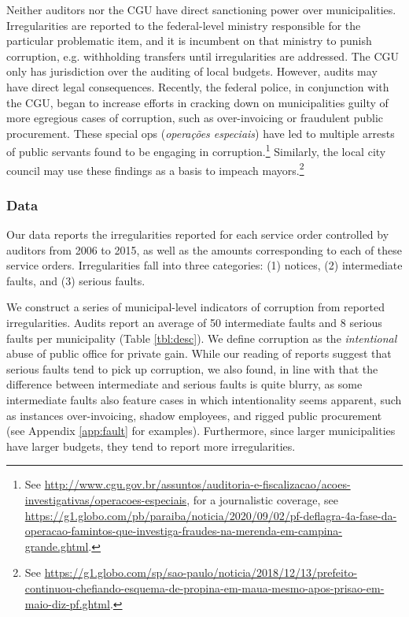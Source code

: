 \documentclass[12pt,a4paper]{article}
\theoremstyle{definition}
\begin{document}
Neither auditors nor the CGU have direct sanctioning power over municipalities. Irregularities are reported to the federal-level ministry responsible for the particular problematic item, and it is incumbent on that ministry to punish corruption, e.g. withholding transfers until irregularities are addressed. The CGU only has jurisdiction over the auditing of local budgets. However, audits may have direct legal consequences. Recently, the federal police, in conjunction with the CGU, began to increase efforts in cracking down on municipalities guilty of more egregious cases of corruption, such as over-invoicing or fraudulent public procurement. These special ops (\emph{operações especiais}) have led to multiple arrests of public servants found to be engaging in corruption.\footnote{See \url{http://www.cgu.gov.br/assuntos/auditoria-e-fiscalizacao/acoes-investigativas/operacoes-especiais}, for a journalistic coverage, see \url{https://g1.globo.com/pb/paraiba/noticia/2020/09/02/pf-deflagra-4a-fase-da-operacao-famintos-que-investiga-fraudes-na-merenda-em-campina-grande.ghtml}.} Similarly, the local city council may use these findings as a basis to impeach mayors.\footnote{See \url{https://g1.globo.com/sp/sao-paulo/noticia/2018/12/13/prefeito-continuou-chefiando-esquema-de-propina-em-maua-mesmo-apos-prisao-em-maio-diz-pf.ghtml}.}  %

\subsubsection*{Data}

Our data reports the irregularities reported for each service order controlled by auditors from 2006 to 2015, as well as the amounts corresponding to each of these service orders. Irregularities fall into three categories: (1) notices, (2) intermediate faults, and (3) serious faults. 

We construct a series of municipal-level indicators of corruption from reported irregularities. Audits report an average of 50 intermediate faults and 8 serious faults per municipality (Table \ref{tbl:desc}). We define corruption as the \emph{intentional} abuse of public office for private gain. While our reading of reports suggest that serious faults tend to pick up corruption, we also found, in line with \citet{avis_government_2018} that the difference between intermediate and serious faults is quite blurry, as some intermediate faults also feature cases in which intentionality seems apparent, such as instances over-invoicing, shadow employees, and rigged public procurement (see Appendix \ref{app:fault} for examples). Furthermore, since larger municipalities have larger budgets, they tend to report more irregularities. 
\end{document}
